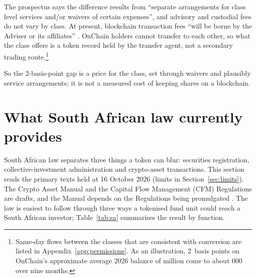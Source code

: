 \documentclass[12pt,a4paper]{article}
\begin{document}
The prospectus says the difference results from ``separate arrangements for class level services and/or waivers of certain expenses'', and advisory and custodial fees do not vary by class. At present, blockchain transaction fees ``will be borne by the Adviser or its affiliates'' \citep[Fund Management; Use of Blockchain]{FidelityTDF2026}. OnChain holders cannot transfer to each other, so what the class offers is a token record held by the transfer agent, not a secondary trading route.\footnote{Same-day flows between the classes that are consistent with conversion are listed in Appendix~\ref{app:permissions}. As an illustration, 2~basis points on OnChain's approximate average 2026 balance of  million come to about 000 over nine months.}

So the 2-basis-point gap is a price for the class, set through waivers and plausibly service arrangements; it is not a measured cost of keeping shares on a blockchain.

\section{What South African law currently provides}\label{sec:sa}
South African law separates three things a token can blur: securities registration, collective-investment administration and crypto-asset transactions. This section reads the primary texts held at 16 October 2026 (limits in Section~\ref{sec:limits}). The Crypto Asset Manual and the Capital Flow Management (CFM) Regulations are drafts, and the Manual depends on the Regulations being promulgated \citep[p.~2]{SARB2026Circular19}. The law is easiest to follow through three ways a tokenised fund unit could reach a South African investor; Table~\ref{tab:sa} summarises the result by function.
\end{document}
